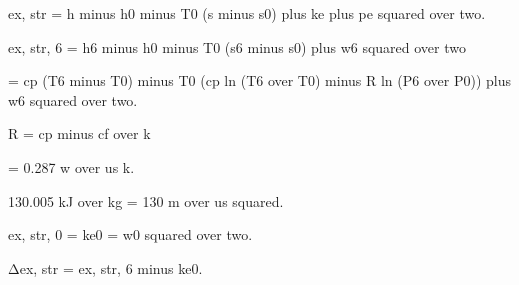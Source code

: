 ex, str = h minus h0 minus T0 (s minus s0) plus ke plus pe squared over two.

ex, str, 6 = h6 minus h0 minus T0 (s6 minus s0) plus w6 squared over two

= cp (T6 minus T0) minus T0 (cp ln (T6 over T0) minus R ln (P6 over P0)) plus w6 squared over two.

R = cp minus cf over k

= 0.287 w over us k.

130.005 kJ over kg = 130 m over us squared.

ex, str, 0 = ke0 = w0 squared over two.

Δex, str = ex, str, 6 minus ke0.